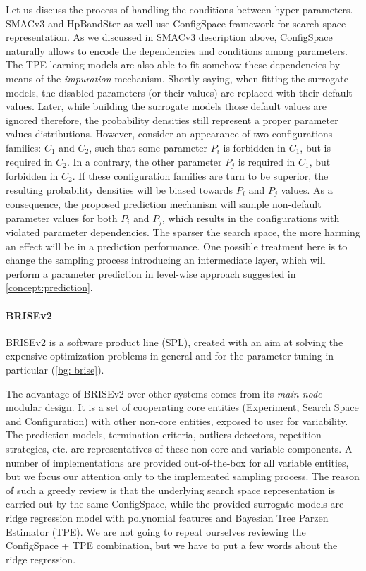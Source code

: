 Let us discuss the process of handling the conditions between hyper-parameters. SMACv3 and HpBandSter as well use ConfigSpace framework for search space representation. As we discussed in SMACv3 description above, ConfigSpace naturally allows to encode the dependencies and conditions among parameters. The TPE learning models are also able to fit somehow these dependencies by means of the \emph{impuration} mechanism\cite{levesque2017bayesian}. Shortly saying, when fitting the surrogate models, the disabled parameters (or their values) are replaced with their default values. Later, while building the surrogate models those default values are ignored therefore, the probability densities still represent a proper parameter values distributions. However, consider an appearance of two configurations families: $C_1$ and $C_2$, such that some parameter $P_i$ is forbidden in $C_1$, but is required in $C_2$. In a contrary, the other parameter $P_j$ is required in $C_1$, but forbidden in $C_2$. If these configuration families are turn to be superior, the resulting probability densities will be biased towards $P_i$ and $P_j$ values. As a consequence, the proposed prediction mechanism will sample non-default parameter values for both $P_i$ and $P_j$, which results in the configurations with violated parameter dependencies. The sparser the search space, the more harming an effect will be in a prediction performance. One possible treatment here is to change the sampling process introducing an intermediate layer, which will perform a parameter prediction in level-wise approach suggested in \cref{concept:prediction}.

\paragraph{BRISEv2}
BRISEv2 is a software product line (SPL), created with an aim at solving the expensive optimization problems in general and for the parameter tuning in particular (\cref{bg: brise}).

The advantage of BRISEv2 over other systems comes from its \emph{main-node} modular design. It is a set of cooperating core entities (Experiment, Search Space and Configuration) with other non-core entities, exposed to user for variability. The prediction models, termination criteria, outliers detectors, repetition strategies, etc. are representatives of these non-core and variable components. A number of implementations are provided out-of-the-box for all variable entities, but we focus our attention only to the implemented sampling process. The reason of such a greedy review is that the underlying search space representation is carried out by the same ConfigSpace, while the provided surrogate models are ridge regression model with polynomial features and Bayesian Tree Parzen Estimator (TPE). We are not going to repeat ourselves reviewing the ConfigSpace + TPE combination, but we have to put a few words about the ridge regression.

